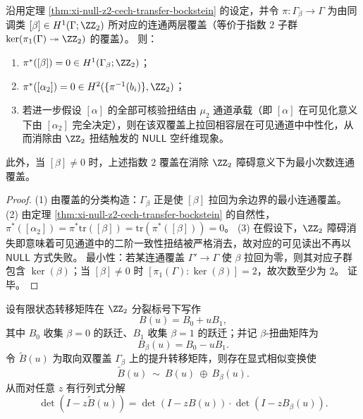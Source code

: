 \begin{theorem}\label{thm:xi-null-z2-doublecover-min-desingularization}
沿用定理 \ref{thm:xi-null-z2-cech-transfer-bockstein} 的设定，并令
\(\pi:\Gamma_\beta\to\Gamma\)
为由同调类 \([\beta]\in H^1(\Gamma;\ZZ_2)\) 所对应的连通两层覆盖（等价于指数 \(2\) 子群 \(\ker(\pi_1(\Gamma)\twoheadrightarrow\ZZ_2)\) 的覆盖）。
则：
\begin{enumerate}
  \item \(\pi^*([\beta])=0\in H^1(\Gamma_\beta;\ZZ_2)\)；
  \item \(\pi^*([\alpha_2])=0\in H^2(\{\pi^{-1}(b_i)\},\ZZ_2)\)；
  \item 若进一步假设 \([\alpha]\) 的全部可核验扭结由 \(\mu_2\) 通道承载（即 \([\alpha]\) 在可见化意义下由 \([\alpha_2]\) 完全决定），则在该双覆盖上拉回相容层在可见通道中中性化，从而消除由 \(\ZZ_2\) 扭结触发的 \(\mathsf{NULL}\) 空纤维现象。
\end{enumerate}
此外，当 \([\beta]\neq 0\) 时，上述指数 \(2\) 覆盖在消除 \(\ZZ_2\) 障碍意义下为最小次数连通覆盖。
\end{theorem}

\begin{proof}
(1) 由覆盖的分类构造：\(\Gamma_\beta\) 正是使 \([\beta]\) 拉回为余边界的最小连通覆盖。
(2) 由定理 \ref{thm:xi-null-z2-cech-transfer-bockstein} 的自然性，
\(
\pi^*([\alpha_2])=\pi^*\mathrm{tr}([\beta])=\mathrm{tr}(\pi^*([\beta]))=0
\)。
(3) 在假设下，\(\ZZ_2\) 障碍消失即意味着可见通道中的二阶一致性扭结被严格消去，故对应的可见读出不再以 \(\mathsf{NULL}\) 方式失败。
最小性：若某连通覆盖 \(\Gamma'\to\Gamma\) 使 \(\beta\) 拉回为零，则其对应子群包含 \(\ker(\beta)\)；当 \([\beta]\neq 0\) 时 \([\pi_1(\Gamma):\ker(\beta)]=2\)，故次数至少为 \(2\)。
证毕。
\end{proof}

\begin{theorem}\label{thm:xi-null-z2-spectral-splitting-doublecover}
设有限状态转移矩阵在 \(\ZZ_2\) 分裂标号下写作
\[
B(u)=B_0+uB_1,
\]
其中 \(B_0\) 收集 \(\beta=0\) 的跃迁、\(B_1\) 收集 \(\beta=1\) 的跃迁；并记 \(\beta\)-扭曲矩阵为
\[
B_\beta(u)=B_0-uB_1.
\]
令 \(\widetilde B(u)\) 为取向双覆盖 \(\Gamma_\beta\) 上的提升转移矩阵，则存在显式相似变换使
\[
\widetilde B(u)\ \sim\ B(u)\ \oplus\ B_\beta(u).
\]
从而对任意 \(z\) 有行列式分解
\[
\det(I-z\widetilde B(u))=\det(I-zB(u))\cdot \det(I-zB_\beta(u)).
\]
\end{theorem}


